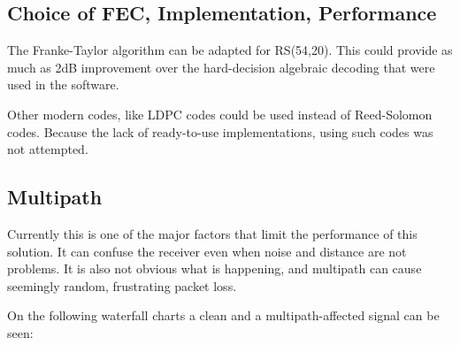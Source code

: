 \documentclass[a4paper]{article}
\begin{document}
\subsection{Choice of FEC, Implementation, Performance}

The Franke-Taylor algorithm\cite{ft1} can be adapted for RS(54,20).
This could provide as much as 2dB improvement over the hard-decision
algebraic decoding that were used in the software.

Other modern codes, like LDPC codes could be used instead of
Reed-Solomon codes. Because the lack of ready-to-use implementations,
using such codes was not attempted.

\subsection{Multipath}

Currently this is one of the major factors that limit the performance 
of this solution. It can confuse the receiver even when noise and
distance are not problems. It is also not obvious what is happening,
and multipath can cause seemingly random, frustrating packet loss.

On the following waterfall charts a clean and a multipath-affected
signal can be seen:
\end{document}
